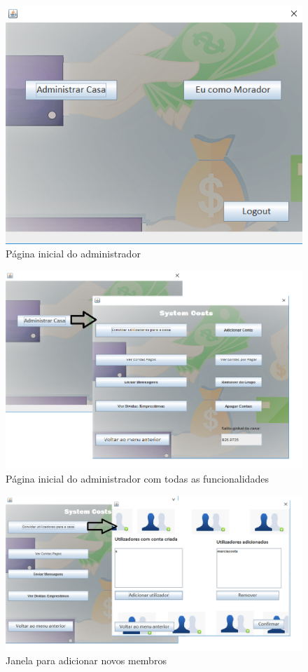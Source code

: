 \begin{figure}[h!]
	\centering
	\includegraphics[scale=0.6]{imagens/interface/paginicialadmin}  
	\caption{Página inicial do administrador}  
\end{figure}

\begin{figure}[h!]
	\centering
	\includegraphics[scale=0.6]{imagens/interface/botaoadmin}  
	\caption{Página inicial do administrador com todas as funcionalidades}  
\end{figure}

\begin{figure}[h!]
	\centering
	\includegraphics[scale=0.6]{imagens/interface/botaoadicionamorador}  
	\caption{Janela para adicionar novos membros}  
\end{figure}

